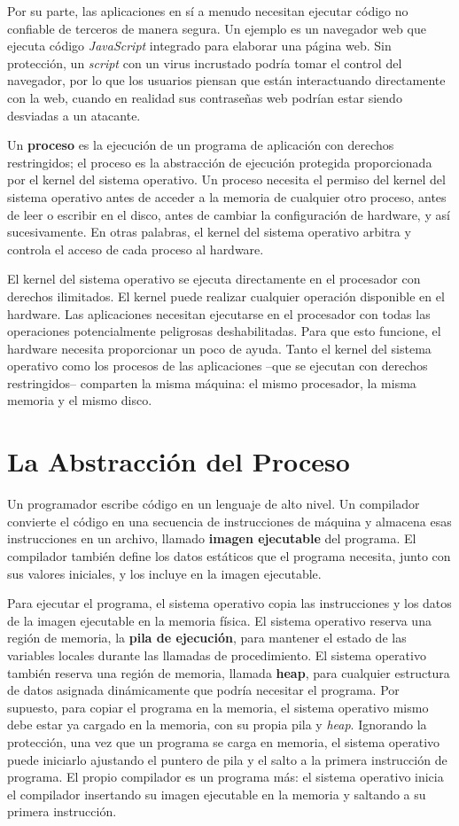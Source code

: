 \documentclass[10pt]{book}
\begin{document}
Por su parte, las aplicaciones en sí a menudo necesitan ejecutar código no confiable de terceros de manera segura. Un ejemplo es un navegador web que ejecuta código \textit{JavaScript} integrado para elaborar una página web. Sin protección, un \textit{script} con un virus incrustado podría tomar el control del navegador, por lo que los usuarios piensan que están interactuando directamente con la web, cuando en realidad sus contraseñas web podrían estar siendo desviadas a un atacante.

Un \textbf{proceso} es la ejecución de un programa de aplicación con derechos restringidos; el proceso es la abstracción de ejecución protegida proporcionada por el kernel del sistema operativo. Un proceso necesita el permiso del kernel del sistema operativo antes de acceder a la memoria de cualquier otro proceso, antes de leer o escribir en el disco, antes de cambiar la configuración de hardware, y así sucesivamente. En otras palabras, el kernel del sistema operativo arbitra y controla el acceso de cada proceso al hardware.

El kernel del sistema operativo se ejecuta directamente en el procesador con derechos ilimitados. El kernel puede realizar cualquier operación disponible en el hardware. Las aplicaciones necesitan ejecutarse en el procesador con todas las operaciones potencialmente peligrosas deshabilitadas. Para que esto funcione, el hardware necesita proporcionar un poco de ayuda. Tanto el kernel del sistema operativo como los procesos de las aplicaciones --que se ejecutan con derechos restringidos-- comparten la misma máquina: el mismo procesador, la misma memoria y el mismo disco.


\section{La Abstracción del Proceso}
Un programador escribe código en un lenguaje de alto nivel. Un compilador convierte el código en una secuencia de instrucciones de máquina y almacena esas instrucciones en un archivo, llamado \textbf{imagen ejecutable} del programa. El compilador también define los datos estáticos que el programa necesita, junto con sus valores iniciales, y los incluye en la imagen ejecutable.

Para ejecutar el programa, el sistema operativo copia las instrucciones y los datos de la imagen ejecutable en la memoria física. El sistema operativo reserva una región de memoria, la \textbf{pila de ejecución}, para mantener el estado de las variables locales durante las llamadas de procedimiento. El sistema operativo también reserva una región de memoria, llamada \textbf{heap}, para cualquier estructura de datos asignada dinámicamente que podría necesitar el programa. Por supuesto, para copiar el programa en la memoria, el sistema operativo mismo debe estar ya cargado en la memoria, con su propia pila y \textit{heap}. Ignorando la protección, una vez que un programa se carga en memoria, el sistema operativo puede iniciarlo ajustando el puntero de pila y el salto a la primera instrucción de programa. El propio compilador es un programa más: el sistema operativo inicia el compilador insertando su imagen ejecutable en la memoria y saltando a su primera instrucción.
\end{document}
